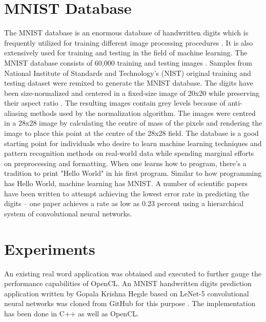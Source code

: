 \section{MNIST Database}
\label{sect5_2}
The \ac{MNIST} database is an enormous database of handwritten digits which is frequently utilized for training different image processing procedures \cite{mnist_wiki}. It is also extensively used for training and testing in the field of machine learning. \newline\newline 
The MNIST database consists of 60,000 training and testing images \cite{mnist_kus_ernst}. Samples from National Institute of Standards and Technology’s (NIST) original training and testing dataset were remixed to generate the MNIST database. The digits have been size-normalized and centered in a fixed-size image of 20x20 while preserving their aspect ratio \cite{cnn_lecun_mnist_app}. The resulting images contain grey levels because of anti-aliasing methods used by the normalization algorithm. The images were centred in a 28x28 image by calculating the centre of mass of the pixels and rendering the image to place this point at the centre of the 28x28 field. \newline\newline
The database is a good starting point for individuals who desire to learn machine learning techniques and pattern recognition methods on real-world data while spending marginal efforts on preprocessing and formatting. When one learns how to program, there's a tradition to print "Hello World" in his first program. Similar to how programming has Hello World, machine learning has MNIST. \newline\newline
A number of scientific papers have been written to attempt achieving the lowest error rate in predicting the digits – one paper achieves a rate as low as 0.23 percent using a hierarchical system of convolutional neural networks.

\section{Experiments}
\label{sect5_3}
An existing real word application was obtained and executed to further gauge the performance capabilities of OpenCL. An MNIST handwritten digits prediction application written by Gopala Krishna Hegde based on LeNet-5 convolutional neural networks was cloned from GitHub for this purpose \cite{cnn_mnist_papaa}. The implementation has been done in C++ as well as OpenCL.

